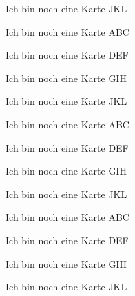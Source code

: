 \documentclass[a7paper,7pt,print,grid=rear]{kartei}
\begin{document}
	\begin{karte}{Ich bin noch eine Karte}
		JKL
	\end{karte}
	\begin{karte}{Ich bin noch eine Karte}
		ABC
	\end{karte}
	\begin{karte}{Ich bin noch eine Karte}
		DEF
	\end{karte}
	\begin{karte}{Ich bin noch eine Karte}
		GIH
	\end{karte}
	\begin{karte}{Ich bin noch eine Karte}
		JKL
	\end{karte}
	\begin{karte}{Ich bin noch eine Karte}
		ABC
	\end{karte}
	\begin{karte}{Ich bin noch eine Karte}
		DEF
	\end{karte}
	\begin{karte}{Ich bin noch eine Karte}
		GIH
	\end{karte}
	\begin{karte}{Ich bin noch eine Karte}
		JKL
	\end{karte}
	\begin{karte}{Ich bin noch eine Karte}
		ABC
	\end{karte}
	\begin{karte}{Ich bin noch eine Karte}
		DEF
	\end{karte}
	\begin{karte}{Ich bin noch eine Karte}
		GIH
	\end{karte}
	\begin{karte}{Ich bin noch eine Karte}
		JKL
	\end{karte}
\end{document}
